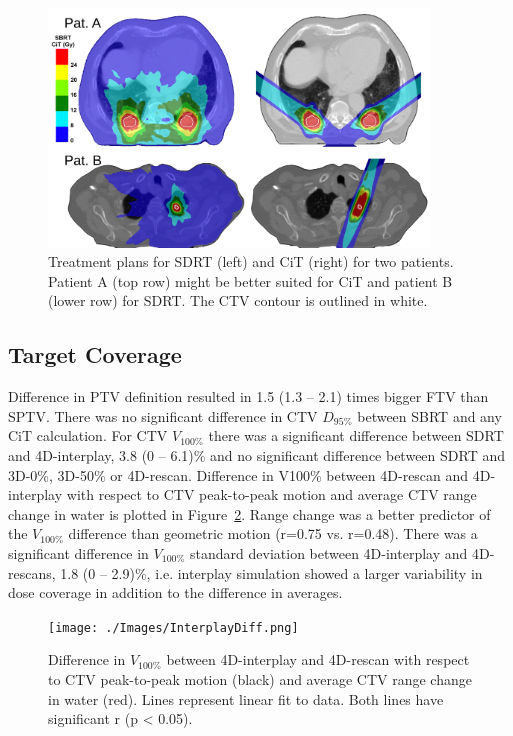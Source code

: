 \documentclass[type=dr, dr=rernat, acm$^3$entcolor=tud7b,colorbacktitle, bigchapter, openright, twoside, 12pt ]{tudthesis}
\begin{document}
\begin{figure}[H]
\begin{center}
\includegraphics[width=0.9\textwidth]{./Images/TreatmentPlans.png}
\caption{Treatment plans for SDRT (left) and CiT (right) for two patients. 
Patient A (top row) might be better suited for CiT and patient B (lower row) for SDRT. The CTV contour is outlined in white.}
\label{Fig:TreatmentPlans}
\end{center}
\end{figure}

\subsection{Target Coverage}



Difference in PTV definition resulted in 1.5 (1.3 – 2.1) times bigger FTV than SPTV. There was no significant difference in CTV $D_{95\%}$ between SBRT and any CiT calculation. 
For CTV $V_{100\%}$ there was a significant difference between SDRT and 4D-interplay, 3.8 (0 – 6.1)\% and no significant difference between SDRT and 3D-0\%, 3D-50\% or 4D-rescan. 
Difference in V100\% between 4D-rescan and 4D-interplay with respect to CTV peak-to-peak motion and average CTV range change in water is plotted in Figure~\ref{Fig:InterplayDiff}. Range change was a 
better predictor of the  $V_{100\%}$ difference than geometric motion (r=0.75 vs. r=0.48).
There was a significant difference in  $V_{100\%}$ standard deviation between 4D-interplay and 4D-rescans, 1.8 (0 – 2.9)\%, i.e. interplay simulation showed a larger variability in dose coverage in addition to the difference in averages.

\begin{figure}[H]
\begin{center}
\texttt{[image: ./Images/InterplayDiff.png]}
\caption{Difference in $V_{100\%}$  between 4D-interplay and 4D-rescan 
with respect to CTV peak-to-peak motion (black) and average CTV range 
change in water (red). Lines represent linear fit to data. Both lines have significant r (p < 0.05).}
\label{Fig:InterplayDiff}
\end{center}
\end{figure}
\end{document}
